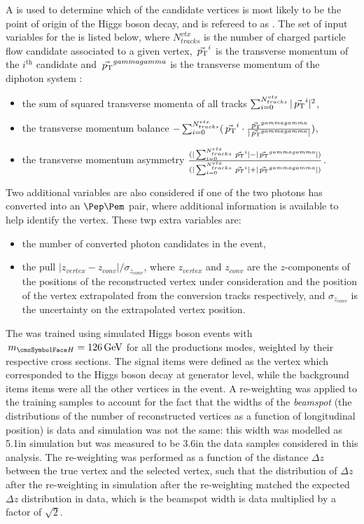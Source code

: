 A \BDT is used to determine which of the candidate vertices is most likely to be the point of origin of the Higgs boson decay, and is refereed to as \VtxIdBdt. The set of input variables for the \VtxIdBdt is listed below, where $N_{tracks}^{vtx}$ is the number of charged particle flow candidate associated to a given vertex, $\vec{\,p_\text{T}}^i$ is the transverse momentum of the $i^{\textrm{th}}$ candidate and $\vec{\,p_\text{T}}^{gammagamma}$ is the transverse momentum of the diphoton system :
\begin{itemize}
\item the sum of squared transverse momenta of all tracks $\sum_{i=0}^{N_{tracks}^{vtx}} | \vec{\,p_\text{T}}^{i} |^2$,
\item the transverse momentum balance  $-\sum_{i=0}^{N_{tracks}^{vtx}} (\vec{\,p_\text{T}}^i \cdot \frac{\vec{\,p_\text{T}}^{gammagamma}}{|\vec{\,p_\text{T}}^{gammagamma}| })$,
\item the transverse momentum asymmetry  $\frac{(|\sum_{i=0}^{N_{tracks}^{vtx}} \vec{\,p_\text{T}}^i| - |\vec{\,p_\text{T}}^{gammagamma}|)}{(|\sum_{i=0}^{N_{tracks}^{vtx}} \vec{\,p_\text{T}}^i| + |\vec{\,p_\text{T}}^{gammagamma}|)}$.
\end{itemize}

Two additional variables are also considered if one of the two photons has converted into an $\Pep\Pem$ pair, where additional information is available to help identify the vertex. These twp extra variables are:
\begin{itemize}
\item the number of converted photon candidates in the event,
\item the pull $|z_{vertex} - z_{conv}|/\sigma_{z_{conv}} $, where $z_{vertex}$ and $ z_{conv}$ are the $z$-components of the positions of the reconstructed vertex under consideration  and the position of the vertex extrapolated from the conversion tracks respectively, and $\sigma_{z_{conv}} $ is the uncertainty on the extrapolated vertex position.
\end{itemize}

The \VtxIdBdt was trained using simulated Higgs boson events with $\mH=126\GeV$ for all the productions modes, weighted by their respective cross sections. The signal items were defined as the vertex which corresponded to the Higgs boson decay at generator level, while the background items items were all the other vertices in the event. A re-weighting was applied to the training samples to account for the fact that the  widths of the \emph{beamspot} (the distributions of the number of reconstructed vertices as a function of longitudinal position) is data and simulation was not the same: this width was modelled as 5.1\cm in simulation but was measured to be 3.6\cm in the data samples considered in this analysis. The re-weighting was performed as a function of the distance $\Delta z$ between the true vertex and the selected vertex, such that the distribution of $\Delta z$ after the re-weighting in simulation after the re-weighting matched the expected $\Delta z$ distribution in data, which is the beamspot width is data multiplied by a factor of $\sqrt{2}$.

